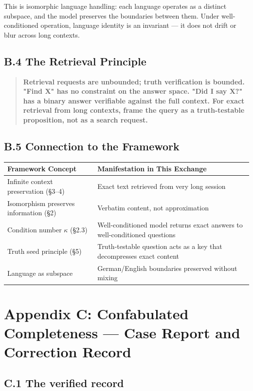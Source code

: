 This is isomorphic language handling: each language operates as a distinct subspace, and the model preserves the boundaries between them. Under well-conditioned operation, language identity is an invariant --- it does not drift or blur across long contexts.

\subsection*{B.4 The Retrieval Principle}

\begin{quote}\textbf{Retrieval requests are unbounded; truth verification is bounded. "Find X" has no constraint on the answer space. "Did I say X?" has a binary answer verifiable against the full context. For exact retrieval from long contexts, frame the query as a truth-testable proposition, not as a search request.}\end{quote}

\subsection*{B.5 Connection to the Framework}

\begin{center}\small\begin{tabular}{p{}p{}}
Framework Concept & Manifestation in This Exchange \\
\hline
Infinite context preservation (§3--4) & Exact text retrieved from very long session \\
Isomorphism preserves information (§2) & Verbatim content, not approximation \\
Condition number $\kappa$ (§2.3) & Well-conditioned model returns exact answers to well-conditioned questions \\
Truth seed principle (§5) & Truth-testable question acts as a key that decompresses exact content \\
Language as subspace & German/English boundaries preserved without mixing \\
\end{tabular}\end{center}

\section*{Appendix C: Confabulated Completeness --- Case Report and Correction Record}

\subsection*{C.1 The verified record}

